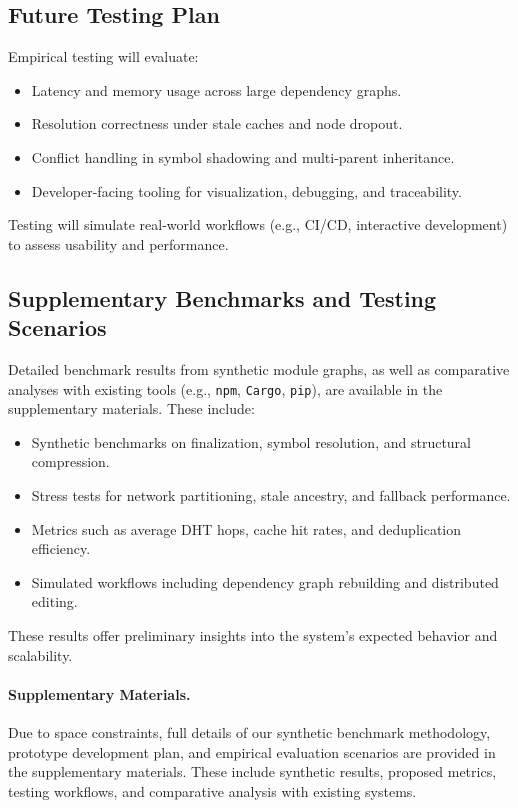 \documentclass[sigplan,screen]{acmart}
\begin{document}
\subsection{Future Testing Plan}

Empirical testing will evaluate:

\begin{itemize}
  \item Latency and memory usage across large dependency graphs.
  \item Resolution correctness under stale caches and node dropout.
  \item Conflict handling in symbol shadowing and multi-parent inheritance.
  \item Developer-facing tooling for visualization, debugging, and traceability.
\end{itemize}

Testing will simulate real-world workflows (e.g., CI/CD, interactive development) to assess usability and performance.

\subsection{Supplementary Benchmarks and Testing Scenarios}
\label{sec:supplementary-benchmarks}

Detailed benchmark results from synthetic module graphs, as well as comparative analyses with existing tools (e.g., \texttt{npm}, \texttt{Cargo}, \texttt{pip}), are available in the supplementary materials. These include:

\begin{itemize}
  \item Synthetic benchmarks on finalization, symbol resolution, and structural compression.
  \item Stress tests for network partitioning, stale ancestry, and fallback performance.
  \item Metrics such as average DHT hops, cache hit rates, and deduplication efficiency.
  \item Simulated workflows including dependency graph rebuilding and distributed editing.
\end{itemize}

These results offer preliminary insights into the system's expected behavior and scalability.

\paragraph{Supplementary Materials.}
Due to space constraints, full details of our synthetic benchmark methodology, prototype development plan, and empirical evaluation scenarios are provided in the supplementary materials. These include synthetic results, proposed metrics, testing workflows, and comparative analysis with existing systems.
\end{document}
